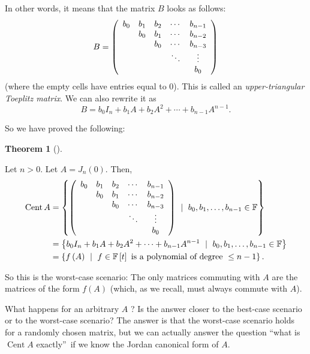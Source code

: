 \documentclass[numbers=enddot,12pt,final,onecolumn,notitlepage]{scrartcl}%
\numberwithin{exer}{subsection}
\theoremstyle{definition}
\newtheorem{theo}{Theorem}[subsection]
\newenvironment{theorem}[1][]
{\begin{theo}[#1]\begin{leftbar}}
{\end{leftbar}\end{theo}}
\begin{document}
In other words, it means that the matrix $B$ looks as follows:%
\[
B=\left(
\begin{array}
[c]{ccccc}%
b_{0} & b_{1} & b_{2} & \cdots & b_{n-1}\\
& b_{0} & b_{1} & \cdots & b_{n-2}\\
&  & b_{0} & \cdots & b_{n-3}\\
&  &  & \ddots & \vdots\\
&  &  &  & b_{0}%
\end{array}
\right)
\]
(where the empty cells have entries equal to $0$). This is called an
\emph{upper-triangular Toeplitz matrix}. We can also rewrite it as%
\[
B=b_{0}I_{n}+b_{1}A+b_{2}A^{2}+\cdots+b_{n-1}A^{n-1}.
\]


So we have proved the following:

\begin{theorem}
\label{thm.jnf.cent.Jn0}Let $n>0$. Let $A=J_{n}\left(  0\right)  $. Then,
\begin{align*}
\operatorname*{Cent}A  &  =\left\{  \left(
\begin{array}
[c]{ccccc}%
b_{0} & b_{1} & b_{2} & \cdots & b_{n-1}\\
& b_{0} & b_{1} & \cdots & b_{n-2}\\
&  & b_{0} & \cdots & b_{n-3}\\
&  &  & \ddots & \vdots\\
&  &  &  & b_{0}%
\end{array}
\right)  \ \mid\ b_{0},b_{1},\ldots,b_{n-1}\in\mathbb{F}\right\} \\
&  =\left\{  b_{0}I_{n}+b_{1}A+b_{2}A^{2}+\cdots+b_{n-1}A^{n-1}\ \mid
\ b_{0},b_{1},\ldots,b_{n-1}\in\mathbb{F}\right\} \\
&  =\left\{  f\left(  A\right)  \ \mid\ f\in\mathbb{F}\left[  t\right]  \text{
is a polynomial of degree }\leq n-1\right\}  .
\end{align*}

\end{theorem}

So this is the worst-case scenario: The only matrices commuting with $A$ are
the matrices of the form $f\left(  A\right)  $ (which, as we recall, must
always commute with $A$).

What happens for an arbitrary $A$ ? Is the answer closer to the best-case
scenario or to the worst-case scenario? The answer is that the worst-case
scenario holds for a randomly chosen matrix, but we can actually answer the
question \textquotedblleft what is $\operatorname*{Cent}A$
exactly\textquotedblright\ if we know the Jordan canonical form of $A$.
\end{document}
